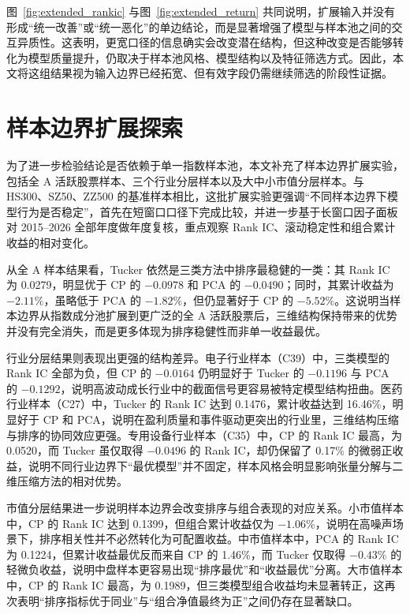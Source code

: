 图~\ref{fig:extended_rankic} 与图~\ref{fig:extended_return} 共同说明，扩展输入并没有形成“统一改善”或“统一恶化”的单边结论，而是显著增强了模型与样本池之间的交互异质性。这表明，更宽口径的信息确实会改变潜在结构，但这种改变是否能够转化为模型质量提升，仍取决于样本池风格、模型结构以及特征筛选方式。因此，本文将这组结果视为输入边界已经拓宽、但有效字段仍需继续筛选的阶段性证据。

\section{样本边界扩展探索}

为了进一步检验结论是否依赖于单一指数样本池，本文补充了样本边界扩展实验，包括全 A 活跃股票样本、三个行业分层样本以及大中小市值分层样本。与 HS300、SZ50、ZZ500 的基准样本相比，这批扩展实验更强调“不同样本边界下模型行为是否稳定”，首先在短窗口口径下完成比较，并进一步基于长窗口因子面板对 2015--2026 全部年度做年度复核，重点观察 Rank IC、滚动稳定性和组合累计收益的相对变化。

从全 A 样本结果看，Tucker 依然是三类方法中排序最稳健的一类：其 Rank IC 为 0.0279，明显优于 CP 的 $-0.0978$ 和 PCA 的 $-0.0490$；同时，其累计收益为 $-2.11\%$，虽略低于 PCA 的 $-1.82\%$，但仍显著好于 CP 的 $-5.52\%$。这说明当样本边界从指数成分池扩展到更广泛的全 A 活跃股票后，三维结构保持带来的优势并没有完全消失，而是更多体现为排序稳健性而非单一收益最优。

行业分层结果则表现出更强的结构差异。电子行业样本（C39）中，三类模型的 Rank IC 全部为负，但 CP 的 $-0.0164$ 仍明显好于 Tucker 的 $-0.1196$ 与 PCA 的 $-0.1292$，说明高波动成长行业中的截面信号更容易被特定模型结构扭曲。医药行业样本（C27）中，Tucker 的 Rank IC 达到 0.1476，累计收益达到 16.46\%，明显好于 CP 和 PCA，说明在盈利质量和事件驱动更突出的行业里，三维结构压缩与排序的协同效应更强。专用设备行业样本（C35）中，CP 的 Rank IC 最高，为 0.0520，而 Tucker 虽仅取得 $-0.0496$ 的 Rank IC，却仍保留了 0.17\% 的微弱正收益，说明不同行业边界下“最优模型”并不固定，样本风格会明显影响张量分解与二维压缩方法的相对优势。

市值分层结果进一步说明样本边界会改变排序与组合表现的对应关系。小市值样本中，CP 的 Rank IC 达到 0.1399，但组合累计收益仅为 $-1.06\%$，说明在高噪声场景下，排序相关性并不必然转化为可配置收益。中市值样本中，PCA 的 Rank IC 为 0.1224，但累计收益最优反而来自 CP 的 1.46\%，而 Tucker 仅取得 $-0.43\%$ 的轻微负收益，说明中盘样本更容易出现“排序最优”和“收益最优”分离。大市值样本中，CP 的 Rank IC 最高，为 0.1989，但三类模型组合收益均未显著转正，这再次表明“排序指标优于同业”与“组合净值最终为正”之间仍存在显著缺口。

